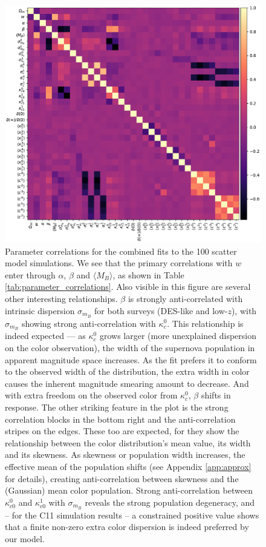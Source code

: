 \documentclass[a4paper,fleqn,usenatbib]{mnras}
\newcommand{\gten}{\citetalias{Guy2010}}
\begin{document}
\begin{figure}
	\begin{center}
		\includegraphics[width=\textwidth]{bulk_cor.pdf}
	\end{center}
	\caption{Parameter correlations for the combined fits to the 100 {\gten} scatter model simulations. We see that the primary correlations with $w$ enter through $\alpha$, $\beta$ and $\langle M_B \rangle$, as shown in Table \ref{tab:parameter_correlations}. Also visible in this figure are several other interesting relationships. $\beta$ is strongly anti-correlated with intrinsic dispersion $\sigma_{m_B}$ for both surveys (DES-like and low-$z$), with $\sigma_{m_B}$ showing strong anti-correlation with $\kappa^0_c$. This relationship is indeed expected --- as $\kappa^0_c$ grows larger (more unexplained dispersion on the color observation), the width of the supernova population in apparent magnitude space increases. As the fit prefers it to conform to the observed width of the distribution, the extra width in color causes the inherent magnitude smearing amount to decrease. And with extra freedom on the observed color from $\kappa^0_c$, $\beta$ shifts in response. The other striking feature in the plot is the strong correlation blocks in the bottom right and the anti-correlation stripes on the edges. These too are expected, for they show the relationship between the color distribution's mean value, its width and its skewness. As skewness or population width increases, the effective mean of the population shifts (see Appendix \ref{app:approx} for details), creating anti-correlation between skewness and the (Gaussian) mean color population. Strong anti-correlation between $\kappa_{c0}^0$ and $\kappa_{c0}^1$ with $\sigma_{m_B}$ reveals the strong population degeneracy, and -- for the C11 simulation results -- a constrained positive value shows that a finite non-zero extra color dispersion is indeed preferred by our model. }
	\label{fig:bulk_cor}
\end{figure}
\end{document}
